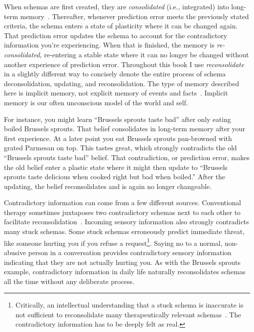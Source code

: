 \documentclass[11pt,oneside]{book}
\let\cite\parencite
\begin{document}
When schemas are first created, they are \textit{consolidated} (i.e., integrated) into long-term memory~\cite{eckerUnlocking}. Thereafter, whenever prediction error meets the previously stated criteria, the schema enters a state of plasticity where it can be changed again. That prediction error updates the schema to account for the contradictory information you're experiencing. When that is finished, the memory is \textit{re-consolidated,} re-entering a stable state where it can no longer be changed without another experience of prediction error. Throughout this book I use \textit{reconsolidate} in a slightly different way to concisely denote the entire process of schema deconsolidation, updating, and reconsolidation. The type of memory described here is implicit memory, not explicit memory of events and facts~\cite{eckerUnlocking}. Implicit memory is our often unconscious model of the world and self.

For instance, you might learn \enquote{Brussels sprouts taste bad} after only eating boiled Brussels sprouts. That belief consolidates in long-term memory after your first experience. At a later point you eat Brussels sprouts pan-browned with grated Parmesan on top. This tastes great, which strongly contradicts the old \enquote{Brussels sprouts taste bad} belief. That contradiction, or prediction error, makes the old belief enter a plastic state where it might then update to \enquote{Brussels sprouts taste delicious when cooked right but bad when boiled.} After the updating, the belief reconsolidates and is again no longer changeable.

Contradictory information can come from a few different sources. Conventional therapy sometimes juxtaposes two contradictory schemas next to each other to facilitate reconsolidation~\cite{eckerUnlocking}. Incoming sensory information also strongly contradicts many stuck schemas. Some stuck schemas erroneously predict immediate threat, like someone hurting you if you refuse a request\footnote{Critically, an intellectual understanding that a stuck schema is inaccurate is not sufficient to reconsolidate many therapeutically relevant schemas~\cite{eckerUnlocking}. The contradictory information has to be deeply felt as real.}. Saying no to a normal, non-abusive person in a conversation provides contradictory sensory information indicating that they are not actually hurting you. As with the Brussels sprouts example, contradictory information in daily life naturally reconsolidates schemas all the time without any deliberate process.
\end{document}
